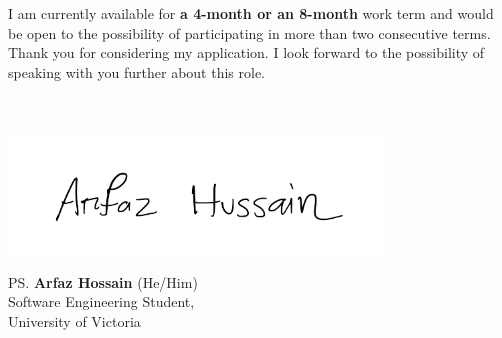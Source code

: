 \documentclass[a4paper, 12pt, oneside]{letter}
\newcommand{\Terms}{a 4-month or an 8-month}
\begin{document}
I am currently available for \textbf{\Terms} work term and would be open to the possibility of participating in more than two consecutive terms. Thank you for considering my application. I look forward to the possibility of speaking with you further about this role. \\\\\\
\vspace{10pt}
\vspace{-25pt}\begin{flushleft}
\hspace*{-1cm}\includegraphics[width=10cm]{../../9.2 PreProcessed/0 Resources/signature.png}\vspace{-1cm}
\end{flushleft}
\vspace{-10pt}\ps{\textbf{Arfaz Hossain} (He/Him)\\
Software Engineering Student,\\
University of Victoria} 
\end{document}
